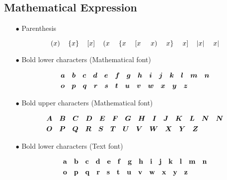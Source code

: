 \subsection{Mathematical Expression}

\begin{itemize}
\item[$\bullet$] Parenthesis 

\begin{equation*}
\pars{x} \quad
\parm{x} \quad
\parb{x} \quad
%
\parls{x} \quad
\parlm{x} \quad
\parlb{x} \quad
%
\parrs{x} \quad
\parrm{x} \quad
\parrb{x} \quad
%
\abs{x} \quad
\rightbar{x}
\end{equation*}

\item[$\bullet$] Bold lower characters (Mathematical font)

\begin{equation*}
\begin{aligned}
&\bm{a} \quad	
\bm{b} \quad
\bm{c} \quad
\bm{d} \quad
\bm{e} \quad
\bm{f} \quad
\bm{g} \quad
\bm{h} \quad
\bm{i} \quad
\bm{j} \quad
\bm{k} \quad
\bm{l} \quad
\bm{m} \quad
\bm{n} 
\\
&\bm{o} \quad
\bm{p} \quad
\bm{q} \quad
\bm{r} \quad
\bm{s} \quad
\bm{t} \quad
\bm{u} \quad
\bm{v} \quad
\bm{w} \quad
\bm{x} \quad
\bm{y} \quad
\bm{z}
\end{aligned}
\end{equation*}

\item[$\bullet$] Bold upper characters (Mathematical font)

\begin{equation*}
	\begin{aligned}
		&\bm{A} \quad	
		\bm{B} \quad
		\bm{C} \quad
		\bm{D} \quad
		\bm{E} \quad
		\bm{F} \quad
		\bm{G} \quad
		\bm{H} \quad
		\bm{I} \quad
		\bm{J} \quad
		\bm{K} \quad
		\bm{L} \quad
		\bm{N} \quad
		\bm{N} 
		\\
		&\bm{O} \quad
		\bm{P} \quad
		\bm{Q} \quad
		\bm{R} \quad
		\bm{S} \quad
		\bm{T} \quad
		\bm{U} \quad
		\bm{V} \quad
		\bm{W} \quad
		\bm{X} \quad
		\bm{Y} \quad
		\bm{Z}
	\end{aligned}
\end{equation*}

\item[$\bullet$] Bold lower characters (Text font)

\begin{equation*}
	\begin{aligned}
		&\mathbf{a} \quad	
		\mathbf{b} \quad
		\mathbf{c} \quad
		\mathbf{d} \quad
		\mathbf{e} \quad
		\mathbf{f} \quad
		\mathbf{g} \quad
		\mathbf{h} \quad
		\mathbf{i} \quad
		\mathbf{j} \quad
		\mathbf{k} \quad
		\mathbf{l} \quad
		\mathbf{m} \quad
		\mathbf{n} 
		\\
		&\mathbf{o} \quad
		\mathbf{p} \quad
		\mathbf{q} \quad
		\mathbf{r} \quad
		\mathbf{s} \quad
		\mathbf{t} \quad
		\mathbf{u} \quad
		\mathbf{v} \quad
		\mathbf{w} \quad
		\mathbf{x} \quad
		\mathbf{y} \quad
		\mathbf{z}
	\end{aligned}
\end{equation*}


\end{itemize}
